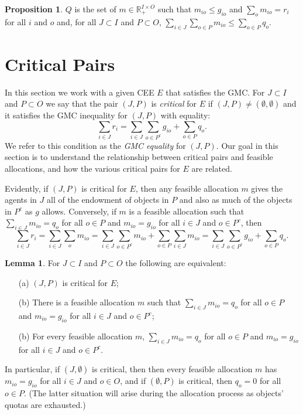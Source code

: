 \documentclass[12pt, A4paper]{article}
\theoremstyle{definition}
\newtheorem{prop}{Proposition}
\newtheorem{lem}{Lemma}
\renewcommand{\Re}{\mathbb{R}}
\begin{document}
\begin{prop} \label{prop:mFeasible}
  $Q$ is the set of $m \in \Re^{I \times O}_+$ such that $m_{io} \le g_{io}$ and $\sum_o m_{io} = r_i$ for all $i$ and $o$ and, for all $J \subset I$ and $P \subset O$, $\sum_{i \in J} \sum_{o \in P} m_{io} \le \sum_{o \in P} q_o.$
\end{prop}

\section{Critical Pairs} \label{sec:Critical}

In this section we work with a given CEE $E$ that satisfies the GMC.
For $J \subset I$ and $P \subset O$ we say that the pair $(J,P)$ is \emph{critical} for $E$ if $(J,P) \ne (\emptyset,\emptyset)$ and it satisfies the GMC inequality for $(J,P)$ with equality: $$\sum_{i \in J} r_i = \sum_{i \in J} \sum_{o
\in P^c} g_{io} + \sum_{o \in P} q_o.$$  We refer to this condition as the \emph{GMC equality} for $(J,P)$. Our goal in this section is to understand the relationship between critical pairs and feasible allocations, and how the various critical pairs for $E$ are related.  

Evidently, if $(J,P)$  is critical for $E$, then any feasible allocation $m$ gives the agents in $J$ all of the endowment of objects in $P$ and also as much of the objects in $P^c$ as $g$ allows.  Conversely, if $m$ is a feasible allocation such that $\sum_{i \in J} m_{io} = q_o$ for all $o \in P$ and $m_{io} = g_{io}$ for all $i \in J$ and $o \in P^c$, then $$\sum_{i \in J} r_i = \sum_{i \in J} \sum_o m_{io} = \sum_{i \in J} \sum_{o \in P^c} m_{io} + \sum_{o \in P} \sum_{i \in J} m_{io} = \sum_{i \in J} \sum_{o \in P^c} g_{io} + \sum_{o \in P} q_o.$$

\begin{lem} \label{lem:critical}
  For $J \subset I$ and $P \subset O$ the following are equivalent:
  \begin{enumerate}
    \item[(a)] $(J,P)$ is critical for $E$; 
    \item[(b)] There is a feasible allocation $m$ such that  $\sum_{i \in J} m_{io} = q_o$ for all $o \in P$ and $m_{io} = g_{io}$ for all $i \in J$ and $o \in P^c$;
    \item[(b)] For every feasible allocation $m$, $\sum_{i \in J} m_{io} = q_o$ for all $o \in P$ and $m_{io} = g_{io}$ for all $i \in J$ and $o \in P^c$.
  \end{enumerate}
\end{lem}
\noindent In particular, if $(J,\emptyset)$ is critical, then then every feasible allocation $m$ has $m_{io} = g_{io}$ for all $i \in J$ and $o \in O$, and if $(\emptyset,P)$ is critical, then $q_o = 0$ for all $o \in P$.  (The latter situation will arise during the allocation process as objects' quotas are exhausted.)
\end{document}
